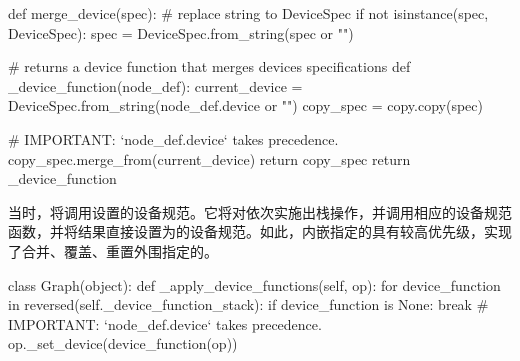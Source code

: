 \begin{content}
\begin{leftbar}
\begin{python}
def merge_device(spec):
  # replace string to DeviceSpec
  if not isinstance(spec, DeviceSpec):
    spec = DeviceSpec.from_string(spec or "")

  # returns a device function that merges devices specifications
  def _device_function(node_def):
    current_device = DeviceSpec.from_string(node_def.device or "")
    copy_spec = copy.copy(spec)

    # IMPORTANT: `node\_def.device` takes precedence.
    copy_spec.merge_from(current_device)      
    return copy_spec
  return _device_function
\end{python}
\end{leftbar}

当时，将调用设置的设备规范。它将对依次实施出栈操作，并调用相应的设备规范函数，并将结果直接设置为的设备规范。如此，内嵌指定的具有较高优先级，实现了合并、覆盖、重置外围指定的。

\begin{leftbar}
\begin{python}
class Graph(object):
  def _apply_device_functions(self, op):
    for device_function in reversed(self._device_function_stack):
      if device_function is None:
        break
      # IMPORTANT: `node\_def.device` takes precedence.  
      op._set_device(device_function(op)) 
\end{python}
\end{leftbar}

\end{content}
